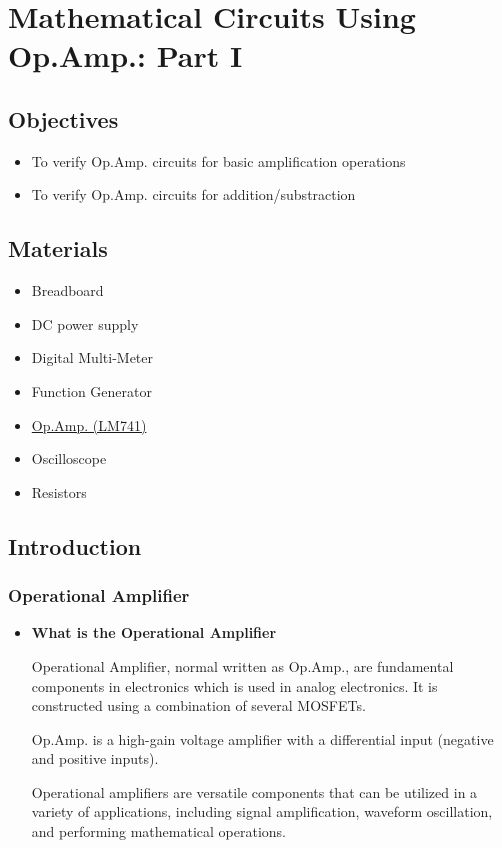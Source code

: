 \chapter{Mathematical Circuits Using Op.Amp.: Part I}


\section{Objectives}
\begin{itemize}
    \item To verify Op.Amp. circuits for basic amplification operations
    \item To verify Op.Amp. circuits for addition/substraction
\end{itemize}

\section{Materials}
\begin{itemize}
    \item Breadboard
    \item DC power supply
    \item Digital Multi-Meter
    \item Function Generator
    \item \hyperref[LM741_1]{Op.Amp. (LM741)}
    \item Oscilloscope
    \item Resistors
\end{itemize}

\section{Introduction}
    \subsection{Operational Amplifier}
        \begin{itemize}
            \item \textbf{What is the Operational Amplifier}\par
                Operational Amplifier, normal written as Op.Amp., are fundamental components in electronics which is used in analog electronics. It is constructed using a combination of several MOSFETs.\par
                Op.Amp. is a high-gain voltage amplifier with a differential input (negative and positive inputs).\par
                Operational amplifiers are versatile components that can be utilized in a variety of applications, including signal amplification, waveform oscillation, and performing mathematical operations.
        \end{itemize}
